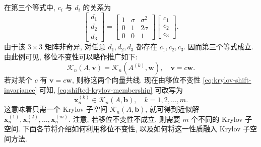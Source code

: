 {在第三个等式中, $c_i$ 与 $d_i$ 的关系为}
\[\begin{bmatrix}d_1\\d_2\\d_3\end{bmatrix}=\begin{bmatrix}1&\sigma&\sigma^2\\0&1&2\sigma\\0&0&1\end{bmatrix}\begin{bmatrix}c_1\\c_2\\c_3\end{bmatrix}.\]
{由于该 $3\times3$ 矩阵非奇异, 对任意 $d_1,d_2,d_3$ 都存在 $c_1,c_2,c_3$. 因而第三个等式成立. 由此例可见, 移位不变性可以略作推广如下:}
\[\mathcal K_n(A,\bm v)=\mathcal K_n(A^{(k)},\bm w),\quad\bm v=c\bm w.\]
{若对某个 $c$ 有 $\bm v=c\bm w$, 则称这两个向量共线.}
{现在由移位不变性 \eqref{eq:krylov-shift-invariance} 可知, \eqref{eq:shifted-krylov-membership} 可改写为}
\[\bm x_n^{(k)}\in\mathcal K_n(A,\bm b),\quad k=1,2,\ldots,m.\]
{这意味着只需一个 Krylov 子空间 $\mathcal K_n(A,\bm b)$, 就可得到近似解 $\bm x_n^{(1)},\bm x_n^{(2)},\ldots,\bm x_n^{(m)}$. 注意, 若移位不变性不成立, 则需要 $m$ 个不同的 Krylov 子空间. 下面各节将介绍如何利用移位不变性, 以及如何将这一性质融入 Krylov 子空间方法.}
